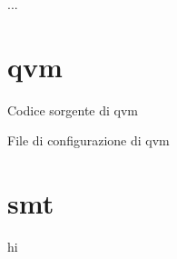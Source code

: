 \documentclass[10pt,titlepage,twoside,a4paper]{report}
\newenvironment{code}{\singlespacing\captionsetup{type=listing}}{}
\begin{document}
...

\appendix
\chapter{qvm} \label{qvm}

\begin{code}
    \caption{Codice sorgente di qvm}
\end{code}

\begin{code}
    \caption{File di configurazione di qvm}
\end{code}

\chapter{smt}
hi



\end{document}
